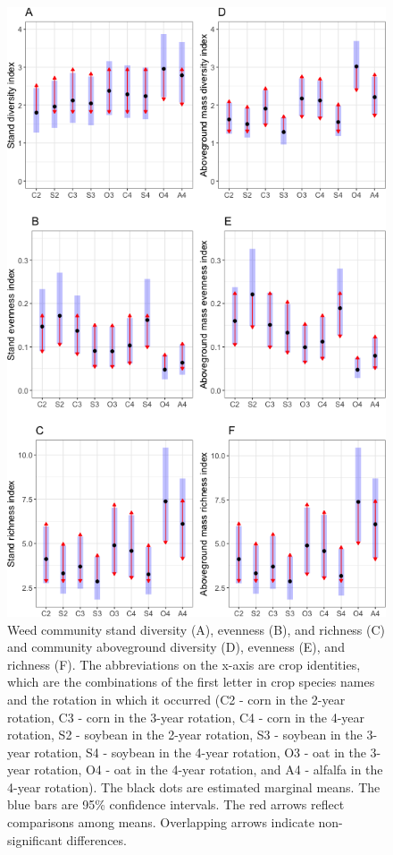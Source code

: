 \documentclass[
]{article}
\begin{document}
\begin{figure}
\centering
\includegraphics{Manuscript_whole_files/figure-latex/index-arrow-p-1.png}
\caption{\label{fig:index-arrow-p}Weed community stand diversity (A), evenness (B), and richness (C) and community aboveground diversity (D), evenness (E), and richness (F). The abbreviations on the x-axis are crop identities, which are the combinations of the first letter in crop species names and the rotation in which it occurred (C2 - corn in the 2-year rotation, C3 - corn in the 3-year rotation, C4 - corn in the 4-year rotation, S2 - soybean in the 2-year rotation, S3 - soybean in the 3-year rotation, S4 - soybean in the 4-year rotation, O3 - oat in the 3-year rotation, O4 - oat in the 4-year rotation, and A4 - alfalfa in the 4-year rotation). The black dots are estimated marginal means. The blue bars are 95\% confidence intervals. The red arrows reflect comparisons among means. Overlapping arrows indicate non-significant differences.}
\end{figure}
\end{document}
